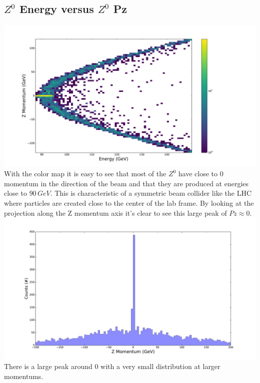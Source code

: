 \documentclass[a4paper, 11pt]{article}
\begin{document}
\subsection*{$Z^0$ Energy versus $Z^0$ Pz}
\includegraphics[width=\textwidth]{Z_stuff/ZE_Zpz.pdf} \\

With the color map it is easy to see that most of the $Z^0$ have close to 0 momentum in the direction of the beam and that they are produced at energies close to $90\,GeV$.  This is characteristic of a symmetric beam collider like the LHC where particles are created close to the center of the lab frame. By looking at the projection along the Z momentum axis it's clear to see this large peak of $Pz \approx 0$. \\

\includegraphics[width=\textwidth]{Z_stuff/Zpz.pdf} \\

There is a large peak around 0 with a very small distribution at larger momentums.
\end{document}
